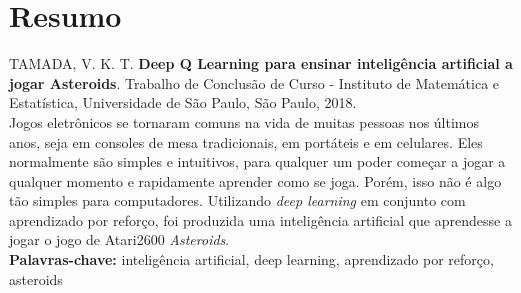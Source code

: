 \chapter*{Resumo}
%
\noindent%
TAMADA, V. K. T. \textbf{Deep Q Learning para ensinar inteligência artificial a jogar Asteroids}. Trabalho de Conclusão de Curso
 - Instituto de Matemática e Estatística, Universidade de São Paulo,
São Paulo, 2018.
\\

Jogos eletrônicos se tornaram comuns na vida de muitas pessoas nos últimos anos, seja em consoles de mesa tradicionais, em portáteis e em celulares.
Eles normalmente são simples e intuitivos, para qualquer um poder começar a jogar a qualquer momento e rapidamente aprender como se joga.
Porém, isso não é algo tão simples para computadores.
Utilizando \textit{deep learning} em conjunto com aprendizado por reforço, foi produzida uma inteligência artificial que aprendesse a jogar o jogo de Atari2600 \textit{Asteroids}.
\\

\noindent%
\textbf{Palavras-chave:} inteligência artificial, deep learning, aprendizado por reforço, asteroids

%
%
